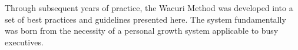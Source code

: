 \documentclass[12pt]{book}
\begin{document}
Through subsequent years of practice, the Wacuri Method was developed
into a set of best practices and guidelines presented here. The system
fundamentally was born from the necessity of a personal growth system
applicable to busy executives.

\end{document}
